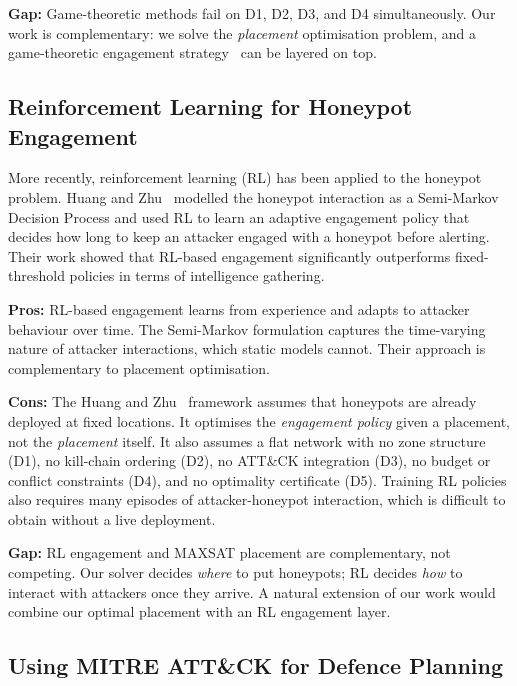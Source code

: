 \documentclass[journal]{IEEEtran}
\begin{document}
\textbf{Gap:} Game-theoretic methods fail on D1, D2, D3,
and D4 simultaneously.
Our work is complementary: we solve the \emph{placement}
optimisation problem, and a game-theoretic engagement
strategy~\cite{huang2019} can be layered on top.

\subsection{Reinforcement Learning for Honeypot Engagement}

More recently, reinforcement learning (RL) has been applied
to the honeypot problem.
Huang and Zhu~\cite{huang2019} modelled the honeypot
interaction as a Semi-Markov Decision Process and used RL
to learn an adaptive engagement policy that decides how long
to keep an attacker engaged with a honeypot before alerting.
Their work showed that RL-based engagement significantly
outperforms fixed-threshold policies in terms of intelligence
gathering.

\textbf{Pros:} RL-based engagement learns from experience
and adapts to attacker behaviour over time.
The Semi-Markov formulation captures the time-varying nature
of attacker interactions, which static models cannot.
Their approach is complementary to placement optimisation.

\textbf{Cons:} The Huang and Zhu~\cite{huang2019} framework
assumes that honeypots are already deployed at fixed
locations.
It optimises the \emph{engagement policy} given a placement,
not the \emph{placement} itself.
It also assumes a flat network with no zone structure (D1),
no kill-chain ordering (D2), no ATT\&CK integration (D3),
no budget or conflict constraints (D4), and no optimality
certificate (D5).
Training RL policies also requires many episodes of
attacker-honeypot interaction, which is difficult to obtain
without a live deployment.

\textbf{Gap:} RL engagement and MAXSAT placement are
complementary, not competing.
Our solver decides \emph{where} to put honeypots; RL
decides \emph{how} to interact with attackers once they
arrive.
A natural extension of our work would combine our optimal
placement with an RL engagement layer.

\subsection{Using MITRE ATT\&CK for Defence Planning}
\end{document}
